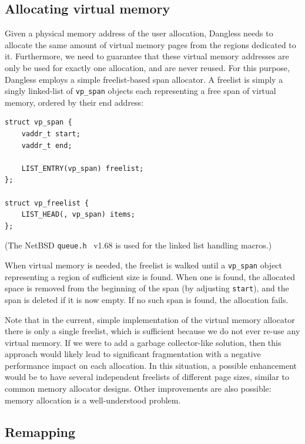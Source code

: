 \subsection{Allocating virtual memory}

Given a physical memory address of the user allocation, Dangless needs to allocate the same amount of virtual memory pages from the regions dedicated to it. Furthermore, we need to guarantee that these virtual memory addresses are only be used for exactly one allocation, and are never reused. For this purpose, Dangless employs a simple freelist-based span allocator. A freelist is simply a singly linked-list of \lstinline!vp_span! objects each representing a free span of virtual memory, ordered by their end address:

\begin{lstlisting}
struct vp_span {
	vaddr_t start;
	vaddr_t end;
	
	LIST_ENTRY(vp_span) freelist;
};

struct vp_freelist {
	LIST_HEAD(, vp_span) items;
};
\end{lstlisting}

(The NetBSD \texttt{queue.h}~\cite{netbsd-queue-ref} v1.68 is used for the linked list handling macros.)

When virtual memory is needed, the freelist is walked until a \lstinline!vp_span! object representing a region of sufficient size is found. When one is found, the allocated space is removed from the beginning of the span (by adjusting \lstinline!start!), and the span is deleted if it is now empty. If no such span is found, the allocation fails.

Note that in the current, simple implementation of the virtual memory allocator there is only a single freelist, which is sufficient because we do not ever re-use any virtual memory. If we were to add a garbage collector-like solution, then this approach would likely lead to significant fragmentation with a negative performance impact on each allocation. In this situation, a possible enhancement would be to have several independent freelists of different page sizes, similar to common memory allocator designs. Other improvements are also possible: memory allocation is a well-understood problem.

\subsection{Remapping}


